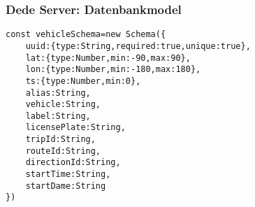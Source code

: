 
\begin{frame}[fragile]
\frametitle{Dede Server: Datenbankmodel}
\begin{lstlisting}
const vehicleSchema=new Schema({
    uuid:{type:String,required:true,unique:true},
    lat:{type:Number,min:-90,max:90},
    lon:{type:Number,min:-180,max:180},
    ts:{type:Number,min:0},
    alias:String,
    vehicle:String,
    label:String,
    licensePlate:String,
    tripId:String,
    routeId:String,
    directionId:String,
    startTime:String,
    startDame:String
})
\end{lstlisting}
\end{frame}

